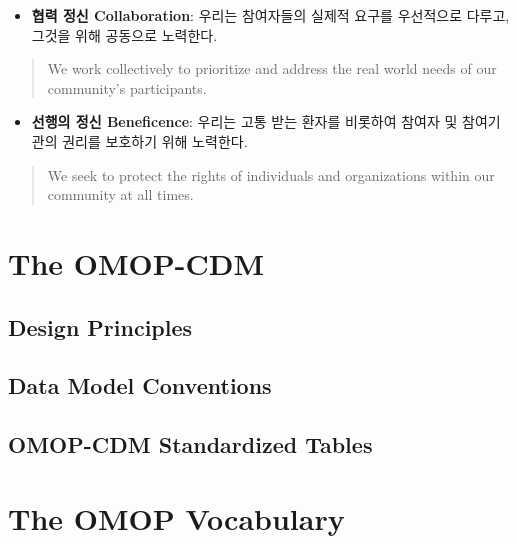 \documentclass[]{book}
\providecommand{\tightlist}{%
  \setlength{\itemsep}{0pt}\setlength{\parskip}{0pt}}
\begin{document}
\begin{itemize}
\tightlist
\item
  \textbf{협력 정신 Collaboration}: 우리는 참여자들의 실제적 요구를 우선적으로 다루고, 그것을 위해 공동으로 노력한다.
\end{itemize}

\begin{quote}
We work collectively to prioritize and address the real world needs of our community's participants.
\end{quote}

\begin{itemize}
\tightlist
\item
  \textbf{선행의 정신 Beneficence}: 우리는 고통 받는 환자를 비롯하여 참여자 및 참여기관의 권리를 보호하기 위해 노력한다.
\end{itemize}

\begin{quote}
We seek to protect the rights of individuals and organizations within our community at all times.
\end{quote}

\hypertarget{omopCdm}{%
\chapter{The OMOP-CDM}\label{omopCdm}}

\hypertarget{design-principles}{%
\section{Design Principles}\label{design-principles}}

\hypertarget{data-model-conventions}{%
\section{Data Model Conventions}\label{data-model-conventions}}

\hypertarget{omop-cdm-standardized-tables}{%
\section{OMOP-CDM Standardized Tables}\label{omop-cdm-standardized-tables}}

\hypertarget{omopVoca}{%
\chapter{The OMOP Vocabulary}\label{omopVoca}}
\end{document}
